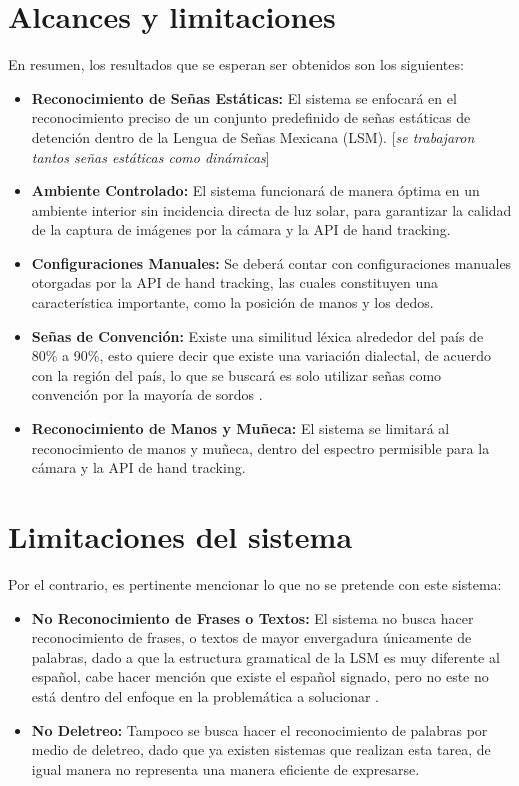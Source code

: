 \section{Alcances y limitaciones}


En resumen, los resultados que se esperan ser obtenidos son los siguientes:

\begin{itemize}
    \item \textbf{Reconocimiento de Señas Estáticas:} El sistema se enfocará en el reconocimiento preciso de un conjunto predefinido de señas estáticas de detención dentro de la Lengua de Señas Mexicana (LSM). [\textit{se trabajaron tantos señas estáticas como dinámicas}]
    \item \textbf{Ambiente Controlado:} El sistema funcionará de manera óptima en un ambiente interior sin incidencia directa de luz solar, para garantizar la calidad de la captura de imágenes por la cámara y la API de hand tracking.
    \item \textbf{Configuraciones Manuales:} Se deberá contar con configuraciones manuales otorgadas por la API de hand tracking, las cuales constituyen una característica importante, como la posición de manos y los dedos.
    \item \textbf{Señas de Convención:} Existe una similitud léxica alrededor del país de 80\% a 90\%, esto quiere decir que existe una variación dialectal, de acuerdo con la región del país, lo que se buscará es solo utilizar señas como convención por la mayoría de sordos \cite{ref22}.
    \item \textbf{Reconocimiento de Manos y Muñeca:} El sistema se limitará al reconocimiento de manos y muñeca, dentro del espectro permisible para la cámara y la API de hand tracking.
\end{itemize}

\section*{Limitaciones del sistema}

Por el contrario, es pertinente mencionar lo que no se pretende con este sistema:

\begin{itemize}
    \item \textbf{No Reconocimiento de Frases o Textos:} El sistema no busca hacer reconocimiento de frases, o textos de mayor envergadura únicamente de palabras, dado a que la estructura gramatical de la LSM es muy diferente al español, cabe hacer mención que existe el español signado, pero no este no está dentro del enfoque en la problemática a solucionar \cite{ref21}.
    \item \textbf{No Deletreo:} Tampoco se busca hacer el reconocimiento de palabras por medio de deletreo, dado que ya existen sistemas que realizan esta tarea, de igual manera no representa una manera eficiente de expresarse.
\end{itemize}
\clearpage
